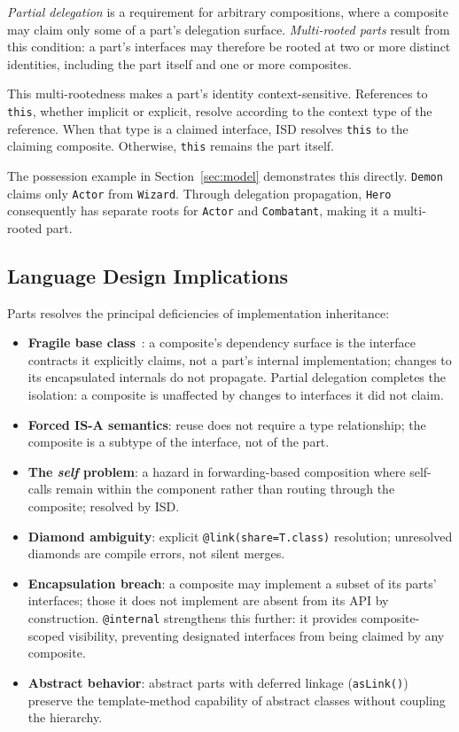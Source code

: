 \documentclass[sigplan,10pt,review,anonymous]{acmart}
\theoremstyle{acmplain}
\newcommand{\code}[1]{\texttt{#1}}
\begin{document}
\emph{Partial delegation} is a requirement for arbitrary compositions, where a composite
may claim only some of a part's delegation surface. \emph{Multi-rooted parts} result
from this condition: a part's interfaces may therefore be rooted at two or more
distinct identities, including the part itself and one or more composites.

This multi-rootedness makes a part's identity context-sensitive. References to
\code{this}, whether implicit or explicit, resolve according to the context type
of the reference. When that type is a claimed interface, ISD resolves \code{this}
to the claiming composite. Otherwise, \code{this} remains the part itself.

The possession example in Section~\ref{sec:model} demonstrates this directly.
\code{Demon} claims only \code{Actor} from \code{Wizard}. Through delegation
propagation, \code{Hero} consequently has separate roots for \code{Actor} and
\code{Combatant}, making it a multi-rooted part.

\subsection{Language Design Implications}

Parts resolves the principal deficiencies of implementation inheritance:

\begin{itemize}
  \item \textbf{Fragile base class}~\cite{mikhajlov1998}: a composite's dependency surface is
        the interface contracts it explicitly claims, not a part's internal
        implementation; changes to its encapsulated internals do not propagate. Partial
        delegation completes the isolation: a composite is unaffected by changes
        to interfaces it did not claim.
  \item \textbf{Forced IS-A semantics}: reuse does not require a type
        relationship; the composite is a subtype of the interface, not of the part.
  \item \textbf{The \emph{self} problem}: a hazard in forwarding-based composition
        where self-calls remain within the component rather than routing
        through the composite; resolved by ISD.
  \item \textbf{Diamond ambiguity}: explicit \code{@link(share=T.class)} resolution;
        unresolved diamonds are compile errors, not silent merges.
  \item \textbf{Encapsulation breach}: a composite may implement a subset
        of its parts' interfaces; those it does not implement are absent from
        its API by construction. \code{@internal} strengthens this further:
        it provides composite-scoped visibility, preventing designated
        interfaces from being claimed by any composite.
  \item \textbf{Abstract behavior}: abstract parts with deferred
        linkage (\code{asLink()}) preserve the template-method capability
        of abstract classes without coupling the hierarchy.
\end{itemize}
\end{document}
